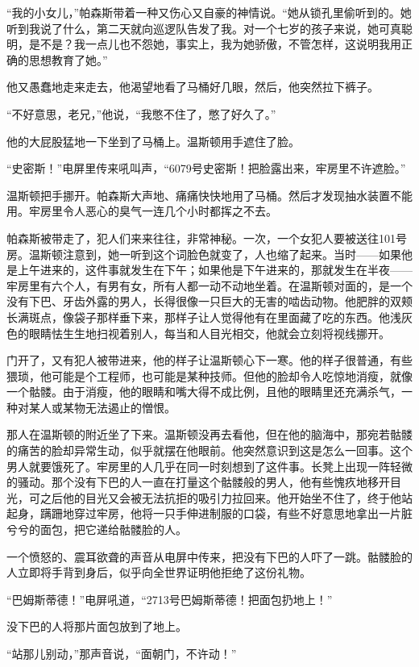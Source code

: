 ``我的小女儿，''帕森斯带着一种又伤心又自豪的神情说。``她从锁孔里偷听到的。她听到我说了什么，第二天就向巡逻队告发了我。对一个七岁的孩子来说，她可真聪明，是不是？我一点儿也不怨她，事实上，我为她骄傲，不管怎样，这说明我用正确的思想教育了她。''

他又愚蠢地走来走去，他渴望地看了马桶好几眼，然后，他突然拉下裤子。

``不好意思，老兄，''他说，``我憋不住了，憋了好久了。''

他的大屁股猛地一下坐到了马桶上。温斯顿用手遮住了脸。

``史密斯！''电屏里传来吼叫声，``6079号史密斯！把脸露出来，牢房里不许遮脸。''

温斯顿把手挪开。帕森斯大声地、痛痛快快地用了马桶。然后才发现抽水装置不能用。牢房里令人恶心的臭气一连几个小时都挥之不去。

帕森斯被带走了，犯人们来来往往，非常神秘。一次，一个女犯人要被送往101号房。温斯顿注意到，她一听到这个词脸色就变了，人也缩了起来。当时------如果他是上午进来的，这件事就发生在下午；如果他是下午进来的，那就发生在半夜------牢房里有六个人，有男有女，所有人都一动不动地坐着。在温斯顿对面的，是一个没有下巴、牙齿外露的男人，长得很像一只巨大的无害的啮齿动物。他肥胖的双颊长满斑点，像袋子那样垂下来，那样子让人觉得他有在里面藏了吃的东西。他浅灰色的眼睛怯生生地扫视着别人，每当和人目光相交，他就会立刻将视线挪开。

门开了，又有犯人被带进来，他的样子让温斯顿心下一寒。他的样子很普通，有些猥琐，他可能是个工程师，也可能是某种技师。但他的脸却令人吃惊地消瘦，就像一个骷髅。由于消瘦，他的眼睛和嘴大得不成比例，且他的眼睛里还充满杀气，一种对某人或某物无法遏止的憎恨。

那人在温斯顿的附近坐了下来。温斯顿没再去看他，但在他的脑海中，那宛若骷髅的痛苦的脸却异常生动，似乎就摆在他眼前。他突然意识到这是怎么一回事。这个男人就要饿死了。牢房里的人几乎在同一时刻想到了这件事。长凳上出现一阵轻微的骚动。那个没有下巴的人一直在打量这个骷髅般的男人，他有些愧疚地移开目光，可之后他的目光又会被无法抗拒的吸引力拉回来。他开始坐不住了，终于他站起身，蹒跚地穿过牢房，他将一只手伸进制服的口袋，有些不好意思地拿出一片脏兮兮的面包，把它递给骷髅脸的人。

一个愤怒的、震耳欲聋的声音从电屏中传来，把没有下巴的人吓了一跳。骷髅脸的人立即将手背到身后，似乎向全世界证明他拒绝了这份礼物。

``巴姆斯蒂德！''电屏吼道，``2713号巴姆斯蒂德！把面包扔地上！''

没下巴的人将那片面包放到了地上。

``站那儿别动，''那声音说，``面朝门，不许动！''

